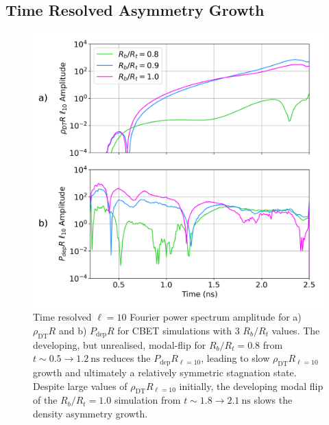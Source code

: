 \subsection{Time Resolved Asymmetry Growth}%
\label{sec:Res1_time_res_growth}

\begin{figure}[t!]
    \includegraphics[width=0.75\linewidth]{Results1/Images/RbRts_mode10_growth.png}
    \centering
    \caption{Time resolved $\ell=10$ Fourier power spectrum amplitude for a) $\rho_{\text{DT}}R$ and b) $P_{\text{dep}}R$ for \ac{CBET} simulations with 3 $R_b/R_t$ values.
    The developing, but unrealised, modal-flip for $R_b/R_t=0.8$ from $t \sim 0.5\rightarrow 1.2\ \text{ns}$ reduces the $P_{\text{dep}}R_{\ell=10}$, leading to slow $\rho_{\text{DT}}R_{\ell=10}$ growth and ultimately a relatively symmetric stagnation state.
    Despite large values of $\rho_{\text{DT}}R_{\ell=10}$ initially, the developing modal flip of the $R_b/R_t=1.0$ simulation from $t \sim 1.8\rightarrow 2.1\ \text{ns}$ slows the density asymmetry growth.}%
    \label{fig:Res1_mode10_growths}
\end{figure}

